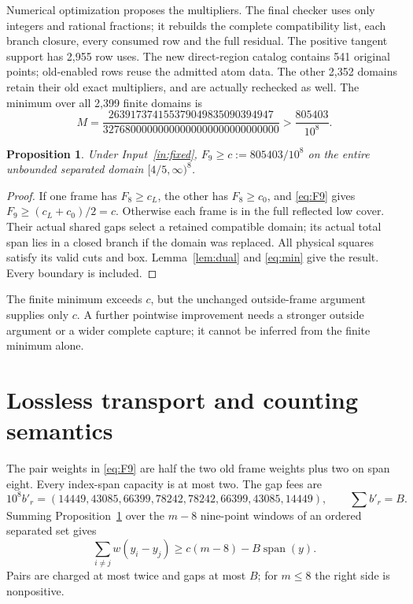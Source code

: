 \documentclass[11pt,a4paper]{article}
\newtheorem{proposition}[theorem]{Proposition}
\begin{document}
Numerical optimization proposes the multipliers. The final checker
uses only integers and rational fractions; it rebuilds the complete
compatibility list, each branch closure, every consumed row and the
full residual. The positive tangent support has 2,955 row uses.
The new direct-region catalog contains 541 original points;
old-enabled rows reuse the admitted atom data. The other 2,352 domains retain their
old exact multipliers, and are actually rechecked as well. The minimum
over all 2,399 finite domains is
\begin{equation}\label{eq:min}
 M=\frac{263917374155379049835090394947}
          {32768000000000000000000000000000}
       >\frac{805403}{10^8}.
\end{equation}

\begin{proposition}\label{prop:uniform}
Under Input~\ref{in:fixed}, $F_9\ge c:=805403/10^8$ on the
entire unbounded separated domain $[4/5,\infty)^8$.
\end{proposition}
\begin{proof}
If one frame has $F_8\ge c_L$, the other has $F_8\ge c_0$, and
\eqref{eq:F9} gives $F_9\ge(c_L+c_0)/2=c$.
Otherwise each frame is in the full reflected low cover. Their actual
shared gaps select a retained compatible domain; its actual total span
lies in a closed branch if the domain was replaced. All physical
squares satisfy its valid cuts and box. Lemma~\ref{lem:dual} and
\eqref{eq:min} give the result. Every boundary is included.
\end{proof}

The finite minimum exceeds $c$, but the unchanged outside-frame
argument supplies only $c$. A further pointwise improvement needs a
stronger outside argument or a wider complete capture; it cannot be
inferred from the finite minimum alone.

\section{Lossless transport and counting semantics}

The pair weights in \eqref{eq:F9} are half the two old frame weights
plus two on span eight. Every index-span capacity is at most two.
The gap fees are
\[
 10^8b'_r=(14449,43085,66399,78242,78242,66399,43085,14449),
 \qquad \sum b'_r=B.
\]
Summing Proposition~\ref{prop:uniform} over the $m-8$ nine-point
windows of an ordered separated set gives
\[
 \sum_{i\ne j}w(y_i-y_j)\ge c(m-8)-B\operatorname{span}(y).
\]
Pairs are charged at most twice and gaps at most $B$; for $m\le8$
the right side is nonpositive.
\end{document}
